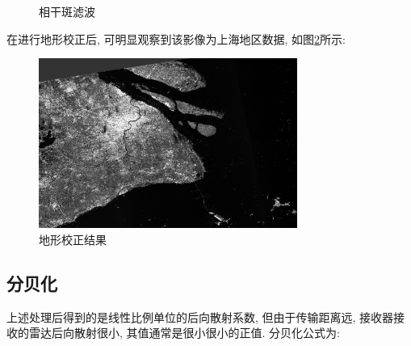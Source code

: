 \begin{figure}[htbp]
    \centering
    \qquad
    \caption{相干斑滤波}
    \label{fig:0308}
\end{figure}

在进行地形校正后, 可明显观察到该影像为上海地区数据, 如图\ref{fig:0309}所示:

\begin{figure}[htbp]
    \centering
    \includegraphics[height=15em]{pic/chap0309.jpg}
    \caption{地形校正结果}
    \label{fig:0309}
\end{figure}

\subsection{分贝化}
上述处理后得到的是线性比例单位的后向散射系数, 但由于传输距离远, 接收器接收的雷达后向散射很小, 其值通常是很小很小的正值. 分贝化公式为:

